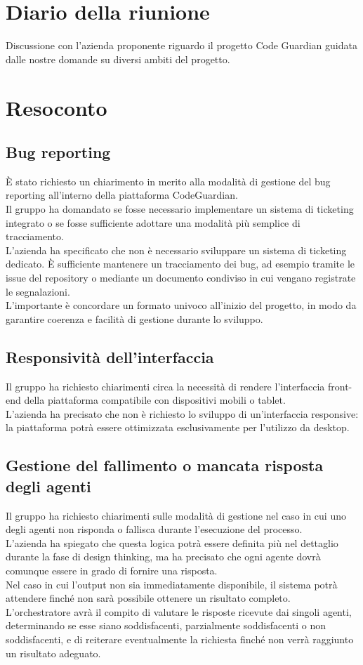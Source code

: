 \section{Diario della riunione}
Discussione con l'azienda proponente riguardo il progetto Code Guardian guidata dalle nostre domande su diversi ambiti del progetto.
\\
\section*{Resoconto}
\subsection{Bug reporting}
È stato richiesto un chiarimento in merito alla modalità di gestione del bug reporting all’interno della piattaforma CodeGuardian.\\
Il gruppo ha domandato se fosse necessario implementare un sistema di ticketing integrato o se fosse sufficiente adottare una modalità più semplice di tracciamento.\\
L’azienda ha specificato che non è necessario sviluppare un sistema di ticketing dedicato. È sufficiente mantenere un tracciamento dei bug, ad esempio tramite le issue del repository o mediante un documento condiviso in cui vengano registrate le segnalazioni.\\
L’importante è concordare un formato univoco all’inizio del progetto, in modo da garantire coerenza e facilità di gestione durante lo sviluppo.

\subsection{Responsività dell'interfaccia}
Il gruppo ha richiesto chiarimenti circa la necessità di rendere l’interfaccia front-end della piattaforma compatibile con dispositivi mobili o tablet.\\
L’azienda ha precisato che non è richiesto lo sviluppo di un’interfaccia responsive: la piattaforma potrà essere ottimizzata esclusivamente per l’utilizzo da desktop.

\subsection{Gestione del fallimento o mancata risposta degli agenti}
Il gruppo ha richiesto chiarimenti sulle modalità di gestione nel caso in cui uno degli agenti non risponda o fallisca durante l’esecuzione del processo.\\
L’azienda ha spiegato che questa logica potrà essere definita più nel dettaglio durante la fase di design thinking, ma ha precisato che ogni agente dovrà comunque essere in grado di fornire una risposta.\\
Nel caso in cui l’output non sia immediatamente disponibile, il sistema potrà attendere finché non sarà possibile ottenere un risultato completo.\\
L’orchestratore avrà il compito di valutare le risposte ricevute dai singoli agenti, determinando se esse siano soddisfacenti, parzialmente soddisfacenti o non soddisfacenti, e di reiterare eventualmente la richiesta finché non verrà raggiunto un risultato adeguato.


